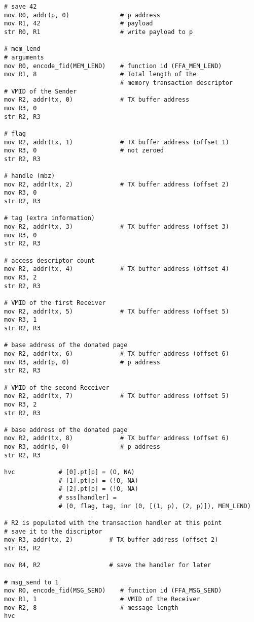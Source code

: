 \documentclass{article}
\begin{document}
\begin{lstlisting}[caption={VM 0}]
# save 42
mov R0, addr(p, 0)              # p address
mov R1, 42                      # payload
str R0, R1                      # write payload to p

# mem_lend
# arguments
mov R0, encode_fid(MEM_LEND)    # function id (FFA_MEM_LEND)
mov R1, 8                       # Total length of the  
                                # memory transaction descriptor
# VMID of the Sender 
mov R2, addr(tx, 0)             # TX buffer address                               
mov R3, 0
str R2, R3

# flag
mov R2, addr(tx, 1)             # TX buffer address (offset 1)                               
mov R3, 0                       # not zeroed
str R2, R3

# handle (mbz)
mov R2, addr(tx, 2)             # TX buffer address (offset 2)
mov R3, 0
str R2, R3

# tag (extra information)
mov R2, addr(tx, 3)             # TX buffer address (offset 3)
mov R3, 0
str R2, R3

# access descriptor count
mov R2, addr(tx, 4)             # TX buffer address (offset 4)
mov R3, 2
str R2, R3

# VMID of the first Receiver
mov R2, addr(tx, 5)             # TX buffer address (offset 5)
mov R3, 1
str R2, R3

# base address of the donated page
mov R2, addr(tx, 6)             # TX buffer address (offset 6)
mov R3, addr(p, 0)              # p address
str R2, R3

# VMID of the second Receiver
mov R2, addr(tx, 7)             # TX buffer address (offset 5)
mov R3, 2
str R2, R3

# base address of the donated page
mov R2, addr(tx, 8)             # TX buffer address (offset 6)
mov R3, addr(p, 0)              # p address
str R2, R3

hvc            # [0].pt[p] = (O, NA)
               # [1].pt[p] = (!O, NA)
               # [2].pt[p] = (!O, NA)
               # sss[handler] = 
               # (0, flag, tag, inr (0, [(1, p), (2, p)]), MEM_LEND)

# R2 is populated with the transaction handler at this point
# save it to the discriptor
mov R3, addr(tx, 2)          # TX buffer address (offset 2)
str R3, R2

mov R4, R2                   # save the handler for later

# msg_send to 1
mov R0, encode_fid(MSG_SEND)    # function id (FFA_MSG_SEND)
mov R1, 1                       # VMID of the Receiver
mov R2, 8                       # message length
hvc


\end{lstlisting}
\end{document}
